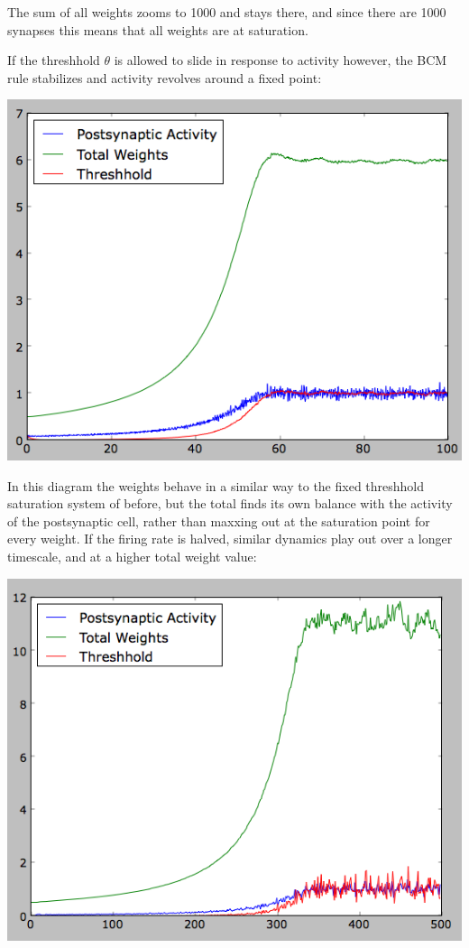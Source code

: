 \documentclass[12pt]{article}
\begin{document}
The sum of all weights zooms to 1000 and stays there, and since there are 1000 synapses this means that all weights are at saturation.

If the threshhold $\theta$ is allowed to slide in response to activity however, the BCM rule stabilizes and activity revolves around a fixed point:

\vspace{15pt}
\includegraphics[scale=0.5]{sliding.png}
\vspace{15pt}

In this diagram the weights behave in a similar way to the fixed threshhold saturation system of before, but the total finds its own balance with the activity of the postsynaptic cell, rather than maxxing out at the saturation point for every weight.  If the firing rate is halved, similar dynamics play out over a longer timescale, and at a higher total weight value:

\vspace{15pt}
\includegraphics[scale=0.6]{halfrate.png}
\vspace{15pt}
\end{document}
